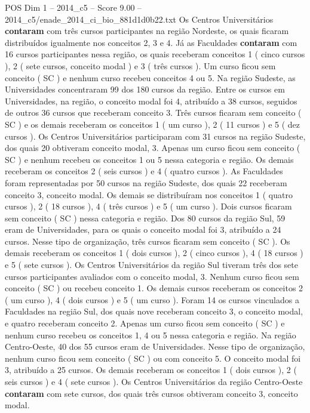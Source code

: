 \begin{textsample}{POS Dim 1 – 2014\_c5 – Score 9.00 – 2014\_c5/enade\_2014\_ci\_bio\_881d1d0b22.txt}
Os Centros Universitários \textbf{contaram} com três cursos participantes na região Nordeste, os quais ficaram distribuídos igualmente nos conceitos 2, 3 e 4.
Já as Faculdades \textbf{contaram} com 16 cursos participantes nessa região, os quais receberam conceitos 1 ( cinco cursos ), 2 ( sete cursos, conceito modal ) e 3 ( três cursos ).
Um curso ficou sem conceito ( SC ) e nenhum curso recebeu conceitos 4 ou 5.
Na região Sudeste, as Universidades concentraram 99 dos 180 cursos da região.
Entre os cursos em Universidades, na região, o conceito modal foi 4, atribuído a 38 cursos, seguidos de outros 36 cursos que receberam conceito 3.
Três cursos ficaram sem conceito ( SC ) e os demais receberam os conceitos 1 ( um curso ), 2 ( 11 cursos ) e 5 ( dez cursos ).
Os Centros Universitários participaram com 31 cursos na região Sudeste, dos quais 20 obtiveram conceito modal, 3.
Apenas um curso ficou sem conceito ( SC ) e nenhum recebeu os conceitos 1 ou 5 nessa categoria e região.
Os demais receberam os conceitos 2 ( seis cursos ) e 4 ( quatro cursos ).
As Faculdades foram representadas por 50 cursos na região Sudeste, dos quais 22 receberam conceito 3, conceito modal.
Os demais se distribuíram nos conceitos 1 ( quatro cursos ), 2 ( 18 cursos ), 4 ( três cursos ) e 5 ( um curso ).
Dois cursos ficaram sem conceito ( SC ) nessa categoria e região.
Dos 80 cursos da região Sul, 59 eram de Universidades, para os quais o conceito modal foi 3, atribuído a 24 cursos.
Nesse tipo de organização, três cursos ficaram sem conceito ( SC ).
Os demais receberam os conceitos 1 ( dois cursos ), 2 ( cinco cursos ), 4 ( 18 cursos ) e 5 ( sete cursos ).
Os Centros Universitários da região Sul tiveram três dos sete cursos participantes avaliados com o conceito modal, 3.
Nenhum curso ficou sem conceito ( SC ) ou recebeu conceito 1.
Os demais cursos receberam os conceitos 2 ( um curso ), 4 ( dois cursos ) e 5 ( um curso ).
Foram 14 os cursos vinculados a Faculdades na região Sul, dos quais nove receberam conceito 3, o conceito modal, e quatro receberam conceito 2.
Apenas um curso ficou sem conceito ( SC ) e nenhum curso recebeu os conceitos 1, 4 ou 5 nessa categoria e região.
Na região Centro-Oeste, 40 dos 55 cursos eram de Universidades.
Nesse tipo de organização, nenhum curso ficou sem conceito ( SC ) ou com conceito 5.
O conceito modal foi 3, atribuído a 25 cursos.
Os demais receberam os conceitos 1 ( dois cursos ), 2 ( seis cursos ) e 4 ( sete cursos ).
Os Centros Universitários da região Centro-Oeste \textbf{contaram} com sete cursos, dos quais três cursos obtiveram conceito 3, conceito modal.

\end{textsample}
